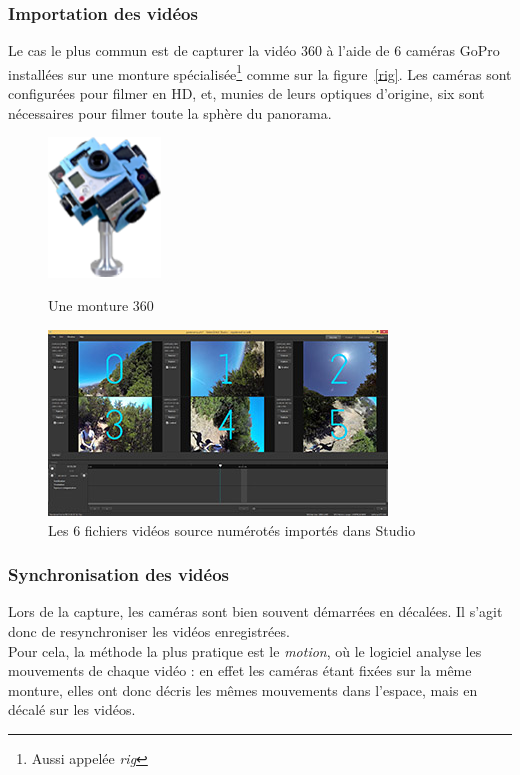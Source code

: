\subsubsection{Importation des vidéos}
\label{importation-videos}
Le cas le plus commun est de capturer la vidéo 360 à l'aide de 6 caméras GoPro 
installées sur une monture spécialisée\footnote{Aussi appelée \textit{rig}} comme sur la figure~\ref{rig}. 
Les caméras sont configurées pour filmer en HD, et, munies de leurs optiques 
d'origine, six sont nécessaires pour filmer toute la sphère du panorama.
\begin{figure}
  \centering
  \begin{minipage}[b]{0.3\textwidth}
    \centering
    \includegraphics[width=3cm]{images/rig.png}
    \caption{Une monture 360}
    \label{rig}
  \end{minipage}%
  \hspace{0.04\textwidth}
  \begin{minipage}[b]{0.65\textwidth}
    \centering
    \includegraphics[width=9cm]{images/studio-sources-numeros.jpg}
    \caption{Les 6 fichiers vidéos source numérotés importés dans Studio}
    \label{importation}
  \end{minipage}
\end{figure}

\subsubsection{Synchronisation des vidéos}
Lors de la capture, les caméras sont bien souvent démarrées en décalées. Il s'agit
donc de resynchroniser les vidéos enregistrées.\\
Pour cela, la méthode la plus pratique est le \textit{motion},
où le logiciel analyse les mouvements de chaque vidéo : en effet les caméras étant fixées
sur la même monture, elles ont donc décris les mêmes mouvements dans l'espace, mais 
en décalé sur les vidéos.

